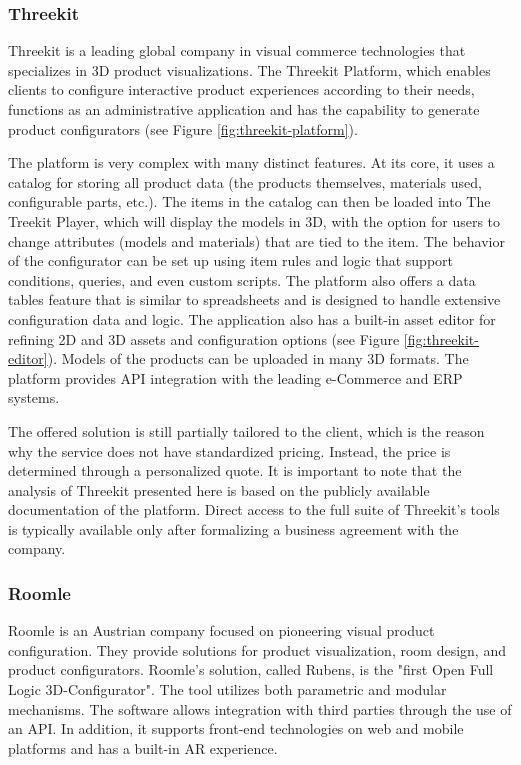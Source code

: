\subsubsection{Threekit}

Threekit is a leading global company in visual commerce technologies that specializes in 3D product visualizations. The Threekit Platform, which enables clients to configure interactive product experiences according to their needs, functions as an administrative application and has the capability to generate product configurators (see Figure \ref{fig:threekit-platform}). \cite{ThreeKitAboutUs} \cite{ThreeKitPlatform}

The platform is very complex with many distinct features. At its core, it uses a catalog for storing all product data (the products themselves, materials used, configurable parts, etc.). The items in the catalog can then be loaded into The Treekit Player, which will display the models in 3D, with the option for users to change attributes (models and materials) that are tied to the item. The behavior of the configurator can be set up using item rules and logic that support conditions, queries, and even custom scripts. The platform also offers a data tables feature that is similar to spreadsheets and is designed to handle extensive configuration data and logic. The application also has a built-in asset editor for refining 2D and 3D assets and configuration options (see Figure \ref{fig:threekit-editor}). Models of the products can be uploaded in many 3D formats. The platform provides API integration with the leading e-Commerce and ERP systems. \cite{ThreeKitPlatformDocumentation}

The offered solution is still partially tailored to the client, which is the reason why the service does not have standardized pricing. Instead, the price is determined through a personalized quote. It is important to note that the analysis of Threekit presented here is based on the publicly available documentation of the platform. Direct access to the full suite of Threekit's tools is typically available only after formalizing a business agreement with the company.


\subsubsection{Roomle}

Roomle is an Austrian company focused on pioneering visual product configuration. They provide solutions for product visualization, room design, and product configurators. Roomle's solution, called Rubens, is the "first Open Full Logic 3D-Configurator". The tool utilizes both parametric and modular mechanisms. The software allows integration with third parties through the use of an API. In addition, it supports front-end technologies on web and mobile platforms and has a built-in AR experience. \cite{RoomleAbout}

